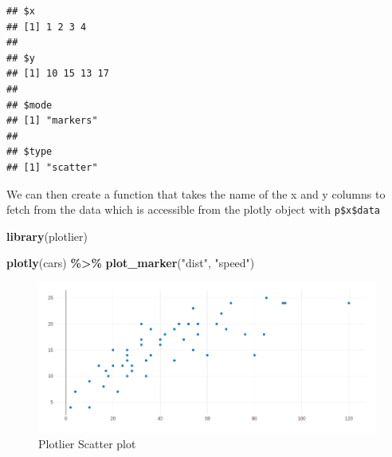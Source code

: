 \documentclass[
]{krantz}
\makeatletter
\newenvironment{Shaded}{\begin{snugshade}}{\end{snugshade}}
\newcommand{\CommentTok}[1]{\textcolor[rgb]{0.37,0.37,0.37}{\textit{#1}}}
\newcommand{\ControlFlowTok}[1]{\textcolor[rgb]{0.27,0.27,0.27}{\textbf{#1}}}
\newcommand{\DataTypeTok}[1]{\textcolor[rgb]{0.27,0.27,0.27}{#1}}
\newcommand{\KeywordTok}[1]{\textcolor[rgb]{0.27,0.27,0.27}{\textbf{#1}}}
\newcommand{\NormalTok}[1]{#1}
\newcommand{\OperatorTok}[1]{\textcolor[rgb]{0.43,0.43,0.43}{\textbf{#1}}}
\newcommand{\StringTok}[1]{\textcolor[rgb]{0.5,0.5,0.5}{#1}}
\newenvironment{kframe}{%
\medskip{}
\setlength{\fboxsep}{.8em}
 \def\at@end@of@kframe{}%
 \ifinner\ifhmode%
  \def\at@end@of@kframe{\end{minipage}}%
  \begin{minipage}{\columnwidth}%
 \fi\fi%
 \def\FrameCommand##1{\hskip\@totalleftmargin \hskip-\fboxsep
 \colorbox{shadecolor}{##1}\hskip-\fboxsep
     \hskip-\linewidth \hskip-\@totalleftmargin \hskip\columnwidth}%
 \MakeFramed {\advance\hsize-\width
   \@totalleftmargin\z@ \linewidth\hsize
   \@setminipage}}%
 {\par\unskip\endMakeFramed%
 \at@end@of@kframe}
\renewenvironment{Shaded}{\begin{kframe}}{\end{kframe}}
\makeatother
\begin{document}
\begin{verbatim}
## $x
## [1] 1 2 3 4
## 
## $y
## [1] 10 15 13 17
## 
## $mode
## [1] "markers"
## 
## $type
## [1] "scatter"
\end{verbatim}

We can then create a function that takes the name of the x and y columns to fetch from the data which is accessible from the plotly object with \texttt{p\$x\$data}

\begin{Shaded}
\end{Shaded}

\begin{Shaded}
\begin{Highlighting}[]
\KeywordTok{library}\NormalTok{(plotlier)}

\KeywordTok{plotly}\NormalTok{(cars) }\OperatorTok{\%\textgreater{}\%}\StringTok{ }
\StringTok{  }\KeywordTok{plot\_marker}\NormalTok{(}\StringTok{"dist"}\NormalTok{, }\StringTok{"speed"}\NormalTok{)}
\end{Highlighting}
\end{Shaded}

\begin{figure}
\centering
\includegraphics{images/plotlier-scatter.png}
\caption{Plotlier Scatter plot}
\end{figure}
\end{document}
